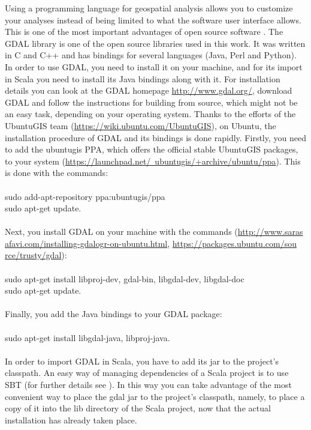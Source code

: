 \documentclass {article}
\begin{document}
Using a programming language for geospatial analysis allows you to customize your analyses instead of being limited to what the software user interface allows. This is one of the most important advantages of open source software \cite{garrard_geoprocessing_2016}. The GDAL library is one of the open source libraries used in this work. It was written in C and C++ and has bindings for several languages (Java, Perl and Python). \\     
In order to use GDAL, you need to install it on your machine, and for its import in Scala you need to install its Java bindings along with it.  
For installation details you can look at the GDAL homepage \href{http://www.gdal.org/}{http://www.gdal.org/}, download GDAL and follow the instructions for building from source, which might not be an easy task, depending on your operating system. 
Thanks to the efforts of the UbuntuGIS team (\href{https://wiki.ubuntu.com/UbuntuGIS}{https://wiki.ubuntu.com/UbuntuGIS}), on Ubuntu, the installation procedure of GDAL and its bindings is done rapidly. Firstly, you need to add the ubuntugis PPA, which offers the official stable UbuntuGIS packages, to your system (\href{https://launchpad.net/~ubuntugis/+archive/ubuntu/ppa}{https://launchpad.net/~ubuntugis/+archive/ubuntu/ppa}). This is done with the commands: \\
\\
sudo add-apt-repository ppa:ubuntugis/ppa \\
sudo apt-get update.\\
\\
Next, you install GDAL on your machine with the commands (\href{http://www.sarasafavi.com/installing-gdalogr-on-ubuntu.html}{http://www.saras\\ afavi.com/installing-gdalogr-on-ubuntu.html}, \href{https://packages.ubuntu.com/source/trusty/gdal}{https://packages.ubuntu.com/sou\\ rce/trusty/gdal}):\\
\\
sudo apt-get install libproj-dev, gdal-bin, libgdal-dev, libgdal-doc \\
sudo apt-get update.\\
\\
Finally, you add the Java bindings to your GDAL package:\\
\\
sudo apt-get install libgdal-java, libproj-java.    \\
\\
In order to import GDAL in Scala, you have to add its jar to the project's classpath. An easy way of managing dependencies of a Scala project is to use SBT (for further details see \cite{tesileanu_using_2017}). In this way you can take advantage of the most convenient way to place the gdal jar to the project's classpath, namely, to place a copy of it into the lib directory of the Scala project, now that the actual installation has already taken place. \\ 
\end{document}
